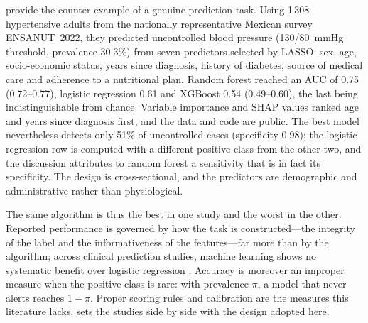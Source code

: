 \documentclass[11pt,a4paper,oneside]{report}
\begin{document}
\Textcite{mendoza2025} provide the counter-example of a genuine prediction task. Using 1\,308 hypertensive adults from the nationally representative Mexican survey ENSANUT~2022, they predicted uncontrolled blood pressure (130/80~mmHg threshold, prevalence 30.3\%) from seven predictors selected by LASSO: sex, age, socio-economic status, years since diagnosis, history of diabetes, source of medical care and adherence to a nutritional plan. Random forest reached an AUC of 0.75 (0.72--0.77), logistic regression 0.61 and XGBoost 0.54 (0.49--0.60), the last being indistinguishable from chance. Variable importance and SHAP values ranked age and years since diagnosis first, and the data and code are public. The best model nevertheless detects only 51\% of uncontrolled cases (specificity 0.98); the logistic regression row is computed with a different positive class from the other two, and the discussion attributes to random forest a sensitivity that is in fact its specificity. The design is cross-sectional, and the predictors are demographic and administrative rather than physiological.

The same algorithm is thus the best in one study and the worst in the other. Reported performance is governed by how the task is constructed---the integrity of the label and the informativeness of the features---far more than by the algorithm; across clinical prediction studies, machine learning shows no systematic benefit over logistic regression \parencite{christodoulou2019}. Accuracy is moreover an improper measure when the positive class is rare: with prevalence $\pi$, a model that never alerts reaches $1-\pi$. Proper scoring rules \parencite{gneiting2007} and calibration \parencite{vancalster2019} are the measures this literature lacks.  sets the studies side by side with the design adopted here.
\end{document}
